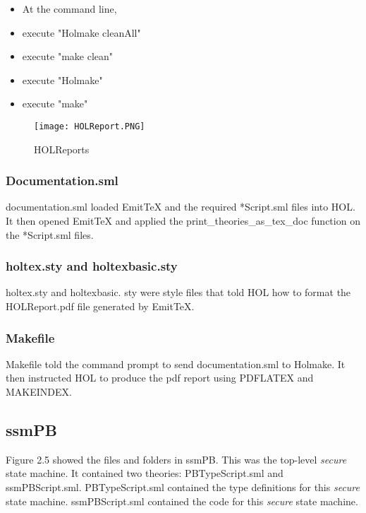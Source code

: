 \begin{itemize}
  \item At the command line, 
\item execute "Holmake cleanAll"
\item execute "make clean"
\item execute "Holmake"
\item execute "make"
  \end{itemize}

\begin{figure}[h]
  \centering
  \texttt{[image: HOLReport.PNG]}
  \caption{HOLReports}
\end{figure}

\subsubsection{Documentation.sml}
\label{sec:documentation.sml}

documentation.sml loaded EmitTeX and the required *Script.sml files into HOL.  It then opened EmitTeX and applied the print_theories_as_tex_doc function on the *Script.sml files.

\subsubsection{holtex.sty and holtexbasic.sty}
\label{sec:holt-holt}

holtex.sty and holtexbasic. sty were style files that told HOL how to format the HOLReport.pdf file generated by EmitTeX.

\subsubsection{Makefile}
\label{sec:makefile}

Makefile told the command prompt to send documentation.sml to Holmake.  It then instructed HOL to produce the pdf report using PDFLATEX and MAKEINDEX.

\subsection{ssmPB}
\label{sec:ssmpb}


Figure 2.5 showed the files and folders in ssmPB.  This was the top-level \emph{secure} state machine.  It contained two theories: PBTypeScript.sml and ssmPBScript.sml.  PBTypeScript.sml contained the type definitions for this \emph{secure} state machine.  ssmPBScript.sml contained the code for this \emph{secure} state machine.  

